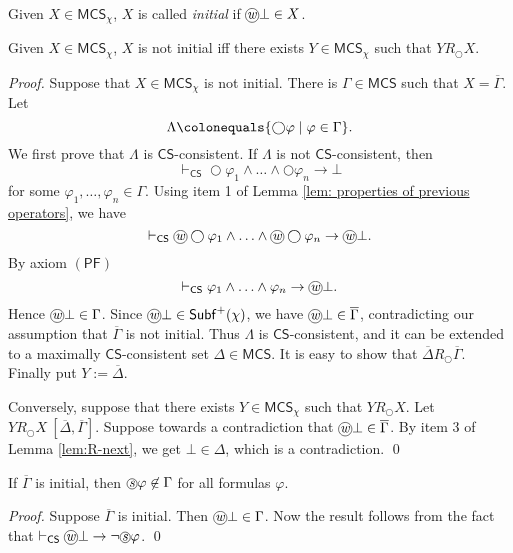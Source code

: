 \documentclass[envcountsect,envcountsame,oribibl,orivec]{llncs}
\newcommand*\circled[1]{\tikz[baseline=(char.base)]{
		\node[shape=circle,draw,inner sep=0.4pt] (char) {#1};}}
\newcommand{\limplies}{\rightarrow}
\newcommand{\lnext}{\bigcirc}
\newcommand{\wprevious}{\circled{\textit{w}}}
\newcommand{\sprevious}{\circled{\textit{s}}}
\newcommand{\pfax}{\ensuremath{(\textsf{PF})}}
\newcommand{\CS}{\textsf{CS}}
\renewcommand{\phi}{\varphi}
\newcommand{\Subf}{\mathsf{Subf}}
\newcommand{\MCS}{\mathsf{MCS}}
\newcommand{\RO}[4]{#1 R_\lnext #2\ [#3, #4]}
\begin{document}
\begin{definition}
	Given $X \in \MCS_\chi$, $X$ is called \textit{initial} if $\wprevious \bot \in X$.
\end{definition}


\begin{lemma}\label{lem:initial state}
	Given $X \in \MCS_\chi$, $X$ is not initial if{f} there exists $Y \in \MCS_\chi$ such that $Y R_\lnext X$.
\end{lemma}
\begin{proof}
	Suppose that $X \in \MCS_\chi$ is not initial. There is $\Gamma \in \MCS$ such that $X = \overline{\Gamma}$. Let
	\[
	\Lambda \colonequals \{ \lnext\phi \mid  \phi \in \Gamma \}.
	\]
	We first prove that $\Lambda$ is $\CS$-consistent.	If $\Lambda$ is not $\CS$-consistent, then
	\[
	\vdash_\CS \lnext\phi_1 \wedge \ldots \wedge \lnext\phi_n \rightarrow \bot
	\]
	for some $\phi_1, \ldots, \phi_n \in \Gamma$. Using item 1 of Lemma \ref{lem: properties of previous operators}, we have
	\[
	\vdash_\CS \wprevious\lnext\phi_1 \wedge \ldots \wedge \wprevious\lnext\phi_n \rightarrow \wprevious\bot.
	\]
	By axiom $\pfax$
	\[
	\vdash_\CS  \phi_1 \wedge \ldots \wedge \phi_n \rightarrow \wprevious\bot.
	\]
	Hence $\wprevious \bot \in \Gamma$. Since $\wprevious \bot \in  \Subf^+(\chi)$, we have $\wprevious \bot \in \overline{\Gamma}$, contradicting our assumption that $\overline{\Gamma}$ is not initial. Thus $\Lambda$ is $\CS$-consistent, and it can be extended to a maximally $\CS$-consistent set $\Delta \in \MCS$. It is easy to show that $\overline{\Delta} R_\lnext \overline{\Gamma}$. Finally put $Y := \overline{\Delta}$.
	
	Conversely, suppose that there exists $Y \in \MCS_\chi$ such that $Y R_\lnext X$. \linebreak Let $\RO{Y}{X}{\overline{\Delta}}{\overline{\Gamma}}$. Suppose towards a contradiction that $\wprevious \bot \in \overline{\Gamma}$. By item 3 of Lemma \ref{lem:R-next}, we get $\bot \in \Delta$, which is a contradiction. \qed 
\end{proof}


\begin{lemma}\label{lem:initial state does not contain strong previous formulas}
	If $\overline{\Gamma}$ is initial, then  $\sprevious \phi \not \in \Gamma$ for all formulas $\phi$.
\end{lemma}
\begin{proof}
	Suppose $\overline{\Gamma}$ is initial. Then $\wprevious \bot \in \Gamma$. Now the result follows from the fact that  $\vdash_\CS   \wprevious \bot \limplies \neg \sprevious \phi$. \qed
\end{proof}
\end{document}
